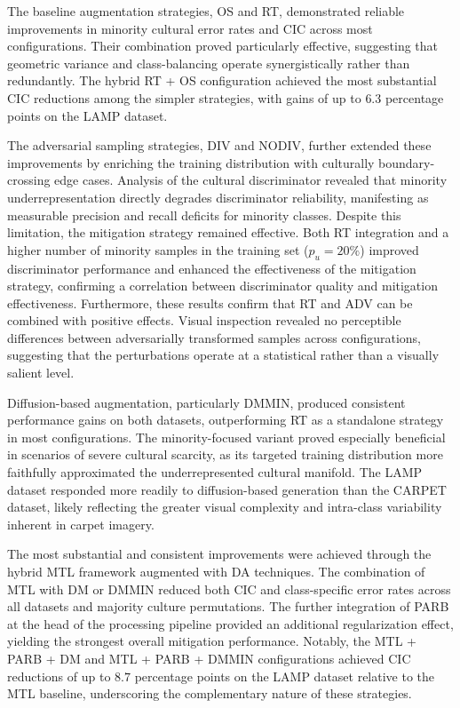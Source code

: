 The baseline augmentation strategies, OS and RT, demonstrated reliable improvements in minority cultural error rates and CIC across most configurations. 
Their combination proved particularly effective, suggesting that geometric variance and class-balancing operate synergistically rather than redundantly. The hybrid RT + OS configuration achieved the most substantial CIC reductions among the simpler strategies, with gains of up to $6.3$ percentage points on the LAMP dataset.

The adversarial sampling strategies, DIV and NODIV, further extended these improvements by enriching the training distribution with culturally boundary-crossing edge cases.
Analysis of the cultural discriminator revealed that minority underrepresentation directly degrades discriminator reliability, manifesting as measurable precision and recall deficits for minority classes. Despite this limitation, the mitigation strategy remained effective.
Both RT integration and a higher number of minority samples in the training set ($p_u = 20\%$) improved discriminator performance and enhanced the effectiveness of the mitigation strategy, confirming a correlation between discriminator quality and mitigation effectiveness. Furthermore, these results confirm that RT and ADV can be combined with positive effects.
Visual inspection revealed no perceptible differences between adversarially transformed samples across configurations, suggesting that the perturbations operate at a statistical rather than a visually salient level.

Diffusion-based augmentation, particularly DMMIN, produced consistent performance gains on both datasets, outperforming RT as a standalone strategy in most configurations. The minority-focused variant proved especially beneficial in scenarios of severe cultural scarcity, as its targeted training distribution more faithfully approximated the underrepresented cultural manifold. The LAMP dataset responded more readily to diffusion-based generation than the CARPET dataset, likely reflecting the greater visual complexity and intra-class variability inherent in carpet imagery.

The most substantial and consistent improvements were achieved through the hybrid MTL framework augmented with DA techniques. 
The combination of MTL with DM or DMMIN reduced both CIC and class-specific error rates across all datasets and majority culture permutations. The further integration of PARB at the head of the processing pipeline provided an additional regularization effect, yielding the strongest overall mitigation performance. Notably, the MTL + PARB + DM and MTL + PARB + DMMIN configurations achieved CIC reductions of up to $8.7$ percentage points on the LAMP dataset relative to the MTL baseline, underscoring the complementary nature of these strategies.

